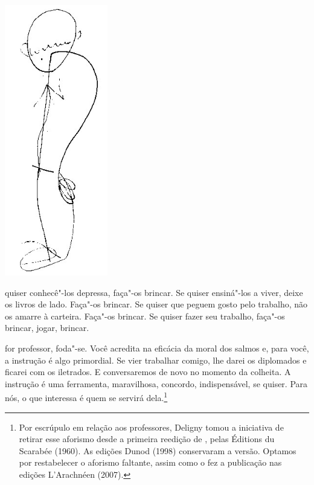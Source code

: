 
\pagebreak
\thispagestyle{empty}

\begin{vplace}[.50]
\begin{center}
\includegraphics[width=45mm]{./imgs/Image_4.jpg}
\end{center}
\end{vplace}

\pagebreak
\thispagestyle{empty}
\movetooddpage

 quiser conhecê"-los depressa, faça"-os brincar. Se quiser ensiná"-los a
viver, deixe os livros de lado. Faça"-os brincar. Se quiser que peguem
gosto pelo trabalho, não os amarre à carteira. Faça"-os brincar. Se
quiser fazer seu trabalho, faça"-os brincar, jogar, brincar.

\bigskip
\bigskip

 for professor, foda"-se. Você acredita na eficácia da moral dos salmos
e, para você, a instrução é algo primordial. Se vier trabalhar comigo,
lhe darei os diplomados e ficarei com os iletrados. E conversaremos de
novo no momento da colheita. A instrução é uma ferramenta, maravilhosa,
concordo, indispensável, se quiser. Para nós, o que interessa é quem se
servirá dela.\footnote{Por escrúpulo em relação aos professores, Deligny
  tomou a iniciativa de retirar esse aforismo desde a primeira reedição
  de {}, pelas Éditions du Scarabée (1960). As
  edições Dunod (1998) conservaram a versão. Optamos por restabelecer o
  aforismo faltante, assim como o fez a publicação nas edições
  L'Arachnéen (2007).}

